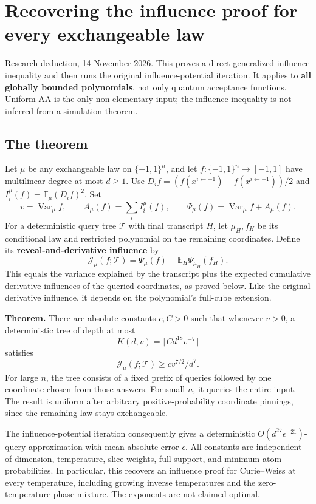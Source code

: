 \section{Recovering the influence proof for every exchangeable
law}\label{recovering-the-influence-proof-for-every-exchangeable-law}

Research deduction, 14 November 2026. This proves a direct generalized
influence inequality and then runs the original influence-potential
iteration. It applies to \textbf{all globally bounded polynomials}, not
only quantum acceptance functions. Uniform AA is the only non-elementary
input; the influence inequality is not inferred from a simulation
theorem.

\subsection{The theorem}\label{influence-recovery:the-theorem}

Let \(\mu\) be any exchangeable law on \(\{-1,1\}^n\), and let
\(f:\{-1,1\}^n\to[-1,1]\) have multilinear degree at most \(d\ge1\). Use
\(D_i f=(f(x^{i\leftarrow+1})-f(x^{i\leftarrow-1}))/2\) and
\(I_i^\mu(f)=\mathbb E_\mu(D_i f)^2\). Set \[
 v=\operatorname{Var}_\mu f,\qquad A_\mu(f)=\sum_i I_i^\mu(f),\qquad
 \Psi_\mu(f)=\operatorname{Var}_\mu f+A_\mu(f).
\] For a deterministic query tree \(\mathcal T\) with final transcript
\(H\), let \(\mu_H,f_H\) be its conditional law and restricted
polynomial on the remaining coordinates. Define its
\textbf{reveal-and-derivative influence} by \[
 \mathcal J_\mu(f;\mathcal T)
 =\Psi_\mu(f)-\mathbb E_H\Psi_{\mu_H}(f_H).                 \tag{1}
\] This equals the variance explained by the transcript plus the
expected cumulative derivative influences of the queried coordinates, as
proved below. Like the original derivative influence, it depends on the
polynomial's full-cube extension.

\textbf{Theorem.} There are absolute constants \(c,C>0\) such that
whenever \(v>0\), a deterministic tree of depth at most \[
 K(d,v)=\lceil C d^{18}v^{-7}\rceil
\] satisfies \[
 \boxed{\mathcal J_\mu(f;\mathcal T)\ge c v^{7/2}/d^7.}    \tag{2}
\] For large \(n\), the tree consists of a fixed prefix of queries
followed by one coordinate chosen from those answers. For small \(n\),
it queries the entire input. The result is uniform after arbitrary
positive-probability coordinate pinnings, since the remaining law stays
exchangeable.

The influence-potential iteration consequently gives a deterministic
\(O(d^{27}\epsilon^{-21})\)-query approximation with mean absolute error
\(\epsilon\). All constants are independent of dimension, temperature,
slice weights, full support, and minimum atom probabilities. In
particular, this recovers an influence proof for Curie--Weiss at every
temperature, including growing inverse temperatures and the
zero-temperature phase mixture. The exponents are not claimed optimal.
